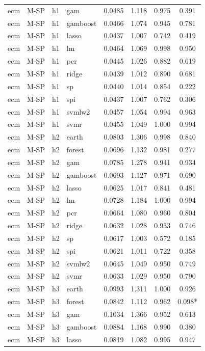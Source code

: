 \begin{ThreePartTable}
\begin{longtable}[t]{llclcccc}
ecm & M-SP & h1 & gam & 0.0485 & 1.118 & 0.975 & 0.391\\
ecm & M-SP & h1 & gamboost & 0.0466 & 1.074 & 0.945 & 0.781\\
ecm & M-SP & h1 & lasso & 0.0437 & 1.007 & 0.742 & 0.419\\
ecm & M-SP & h1 & lm & 0.0464 & 1.069 & 0.998 & 0.950\\
ecm & M-SP & h1 & pcr & 0.0445 & 1.026 & 0.882 & 0.619\\
ecm & M-SP & h1 & ridge & 0.0439 & 1.012 & 0.890 & 0.681\\
ecm & M-SP & h1 & sp & 0.0440 & 1.014 & 0.854 & 0.222\\
ecm & M-SP & h1 & spi & 0.0437 & 1.007 & 0.762 & 0.306\\
ecm & M-SP & h1 & svmlw2 & 0.0457 & 1.054 & 0.994 & 0.963\\
ecm & M-SP & h1 & svmr & 0.0455 & 1.049 & 1.000 & 0.994\\
\addlinespace
ecm & M-SP & h2 & earth & 0.0803 & 1.306 & 0.998 & 0.840\\
ecm & M-SP & h2 & forest & 0.0696 & 1.132 & 0.981 & 0.277\\
ecm & M-SP & h2 & gam & 0.0785 & 1.278 & 0.941 & 0.934\\
ecm & M-SP & h2 & gamboost & 0.0693 & 1.127 & 0.971 & 0.690\\
ecm & M-SP & h2 & lasso & 0.0625 & 1.017 & 0.841 & 0.481\\
ecm & M-SP & h2 & lm & 0.0728 & 1.184 & 1.000 & 0.994\\
ecm & M-SP & h2 & pcr & 0.0664 & 1.080 & 0.960 & 0.804\\
ecm & M-SP & h2 & ridge & 0.0632 & 1.028 & 0.933 & 0.746\\
ecm & M-SP & h2 & sp & 0.0617 & 1.003 & 0.572 & 0.185\\
ecm & M-SP & h2 & spi & 0.0621 & 1.011 & 0.722 & 0.358\\
ecm & M-SP & h2 & svmlw2 & 0.0645 & 1.049 & 0.950 & 0.749\\
ecm & M-SP & h2 & svmr & 0.0633 & 1.029 & 0.950 & 0.790\\
\addlinespace
ecm & M-SP & h3 & earth & 0.0993 & 1.311 & 1.000 & 0.926\\
ecm & M-SP & h3 & forest & 0.0842 & 1.112 & 0.962 & 0.098*\\
ecm & M-SP & h3 & gam & 0.1034 & 1.366 & 0.952 & 0.613\\
ecm & M-SP & h3 & gamboost & 0.0884 & 1.168 & 0.990 & 0.380\\
ecm & M-SP & h3 & lasso & 0.0819 & 1.082 & 0.995 & 0.947\\

\end{longtable}
\end{ThreePartTable}
